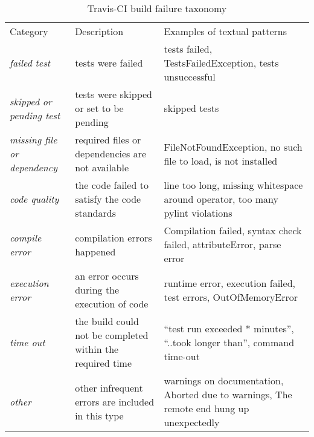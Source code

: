 
\begin{table*}[t] \centering
\small
  \caption{Travis-CI build failure taxonomy
  \vspace{-0.2cm}
  }
  \label{error_types}

\begin{tabular}{ p{3.5cm}  p{5cm}  p{8cm} }
	
\hline 
\\[-1.8ex]\hline
Category & Description & Examples of textual patterns \\ \hline 
\emph{failed test} & tests were failed & tests failed, TestsFailedException, tests unsuccessful\\ \hline
\emph{skipped or pending test} & tests were skipped or set to be pending & skipped tests \\ \hline
\emph{missing file or dependency} & required files or dependencies are not available &  FileNotFoundException, no such file to load, is not installed \\ \hline
\emph{code quality} & the code failed to satisfy the code standards & line too long, missing whitespace around operator, too many pylint violations \\ \hline
\emph{compile error} &compilation errors happened & Compilation failed, syntax check failed, attributeError, parse error\\ \hline
\emph{execution error} &an error occurs during the execution of code & runtime error, execution failed, test errors, OutOfMemoryError\\ \hline
\emph{time out} & the build could not be completed within the required time&“test run exceeded * minutes”, “..took longer than”, command time-out \\ \hline 
\emph{other} &other infrequent errors are included in this type & warnings on documentation, Aborted due to warnings, The remote end hung up unexpectedly \\
\hline

\end{tabular}

\end{table*}

